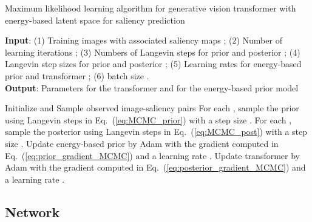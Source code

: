 \documentclass{article}
\begin{document}
\begin{algorithm}[H]
\small
\caption{Maximum likelihood learning algorithm for generative vision transformer with energy-based latent space for saliency prediction}
\textbf{Input}: (1) Training images  with associated saliency maps ;
(2) Number of learning iterations ; (3) Numbers of Langevin steps for prior and posterior ; (4) Langevin step sizes for prior and posterior ; (5) Learning rates for energy-based prior and transformer ; (6) batch size .\\
\textbf{Output}: 
Parameters  for the transformer and  for the energy-based prior model
\begin{algorithmic}[1]
\State Initialize  and  
\State Sample observed image-saliency pairs 
\State For each , sample the prior  using  Langevin steps in Eq.~(\ref{eq:MCMC_prior}) with a step size . 
\State For each , sample the posterior  using  Langevin steps in  Eq.~(\ref{eq:MCMC_post}) with a step size . 
\State Update energy-based prior by Adam with the gradient  computed in Eq.~(\ref{eq:prior_gradient_MCMC}) and a learning rate .
\State Update transformer by Adam with the gradient  computed in Eq.~(\ref{eq:posterior_gradient_MCMC}) and a learning rate .
\EndFor
\end{algorithmic} \label{alg1}
\end{algorithm}




\subsection{Network}\label{network_sec}
\end{document}
